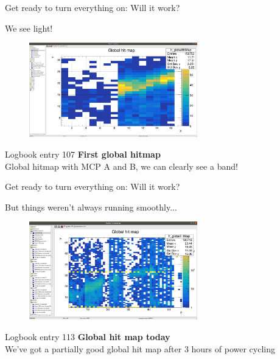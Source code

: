 \documentclass[xcolor = table]{beamer}
\begin{document}
\begin{frame}{Get ready to turn everything on: Will it work?}
  \begin{center}
    \large We see light!
  \end{center}
  \begin{figure}
    \centering
    \includegraphics[width = 0.65\textwidth]{Plots/FirstHitMap.png}
  \end{figure}
  \vspace{-0.2cm}
  \begin{block}{Logbook entry 107}
    \textbf{First global hitmap}\\
    Global hitmap with MCP A and B, we can clearly see a band!
  \end{block}
\end{frame}

\begin{frame}{Get ready to turn everything on: Will it work?}
  \begin{center}
    \large But things weren't always running smoothly...
  \end{center}
  \begin{figure}
    \centering
    \includegraphics[width = 0.65\textwidth]{Plots/SaturdayGlobalHitMap.png}
  \end{figure}
  \vspace{-0.2cm}
  \begin{block}{Logbook entry 113}
    \textbf{Global hit map today}\\
    We've got a partially good global hit map after 3 hours of power cycling
  \end{block}
\end{frame}
\end{document}

